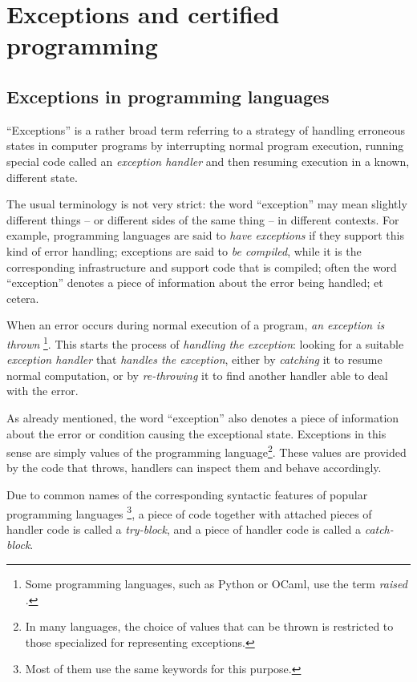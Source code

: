 \chapter{Exceptions and certified programming}

\section{Exceptions in programming languages}

``Exceptions'' is a rather broad term referring to a strategy of handling erroneous
states in computer programs by interrupting normal program execution, running special
code called an \emph{exception handler} and then resuming execution in a known, different
state.

The usual terminology is not very strict: the word ``exception'' may mean slightly
different things -- or different sides of the same thing -- in different contexts.
For example, programming languages are said to \emph{have exceptions} if they support
this kind of error handling; exceptions are said to \emph{be compiled}, while it is the
corresponding infrastructure and support code that is compiled; often the word ``exception''
denotes a piece of information about the error being handled; et cetera.

When an error occurs during normal execution of a program, \emph{an exception is thrown}%
\footnote{Some programming languages, such as Python or OCaml, use the term \emph{raised}
\cite{python:reference}.}.
This starts the
process of \emph{handling the exception}: looking for a suitable
\emph{exception handler} that \emph{handles the exception}, either by \emph{catching} it
to resume normal computation, or by \emph{re-throwing} it to find another handler
able to deal with the error.

As already mentioned, the word ``exception'' also denotes a piece of information about
the error or condition causing the exceptional state. Exceptions in this sense are
simply values of the programming language\footnote{In many languages, the choice of values that
can be thrown is restricted to those specialized for representing exceptions.}.
These values are provided by the code that throws,
handlers can inspect them and behave accordingly.

Due to common names of the corresponding syntactic features of popular programming languages%
\footnote{Most of them use the same keywords for this purpose.},
a piece of code together with attached pieces of handler code is called a \emph{try-block},
and a piece of handler code is called a \emph{catch-block}.

